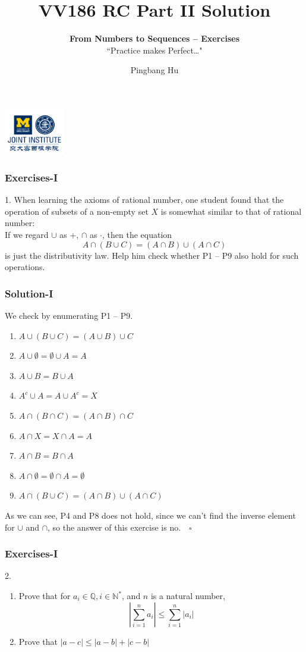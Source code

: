 \documentclass[12pt, t]{beamer}
\title{VV186 RC Part II Solution}
\subtitle{\textbf{From Numbers to Sequences -- Exercises}\\``Practice makes Perfect\dots"}
\institute[UM-SJTU JI]{University of Michigan-Shanghai Jiao Tong University Joint Institute}
\author{Pingbang Hu}
\renewcommand{\emph}[1]{{\color{Turquoise3}\textsl{#1}}}
\begin{document}
\begin{frame}
    \titlepage
    \begin{center}
        \includegraphics[height=2cm]{Figures/logo/logo2.png}
    \end{center}
\end{frame}

\begin{frame}
    \frametitle{Exercises-I}
1. When learning the axioms of rational number, one student found that the operation of subsets of a non-empty 
set $X$ is somewhat similar to that of rational number:\\
\vspace{1em}
If we regard $\cup$ as $+$, $\cap$ as $\cdot$, then the equation 
\begin{equation*}
    A\cap(B\cup C)=(A\cap B)\cup(A\cap C)
\end{equation*}
is just the distributivity law. Help him  check whether P1 -- P9 also hold for such operations.
\end{frame}

\begin{frame}
    \frametitle{Solution-I}
We check by enumerating P1 -- P9.
\begin{enumerate}
    \item $A\cup(B\cup C) = (A\cup B)\cup C$
    \item $A\cup \emptyset =\emptyset \cup A=A$
    \item $A\cup B=B\cup A$
    \item \emph{$A^c\cup A=A\cup A^c=X$}
    \item $A\cap(B\cap C) = (A\cap B)\cap C$
    \item $A\cap X = X\cap A=A$
    \item $A\cap B=B\cap A $
    \item \emph{$A\cap \emptyset=\emptyset \cap A=\emptyset$}
    \item $A\cap (B\cup C)=(A\cap B)\cup (A\cap C)$
\end{enumerate}
As we can see, P4 and P8 does not hold, since we can't find the inverse element for $\cup$ and $\cap$, so the answer of this 
exercise is no.$\quad \square$
\end{frame}

\begin{frame}
    \frametitle{Exercises-I}
2.
\begin{enumerate}
    \item Prove that for $a_i\in \mathbb{Q}, i\in \mathbb{N^*}$, and $n$ is a natural number, 
        \begin{equation*}
            |\sum^n_{i=1}a_i|\leq\sum^n_{i=1}|a_i|
        \end{equation*}
    \item Prove that $|a-c|\leq |a-b| +|c-b|$
\end{enumerate}
\end{frame}
\end{document}
